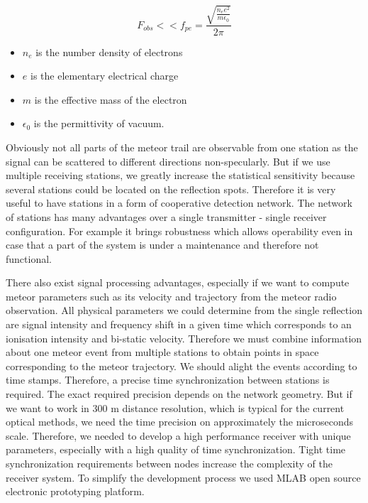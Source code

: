 \documentclass[twoside]{ctuthesis}
\theoremstyle{plain}
\theoremstyle{definition}
\theoremstyle{note}
\begin{document}
\begin{equation}
F_{obs} << f_{pe} =\frac{\sqrt{\frac{n_e e^2}{m \epsilon_0}}}{2 \pi}
\label{equ:plasma_frequency}
\end{equation}
\begin{itemize}
\item $n_e$ is the number density of electrons
\item $e$ is the elementary electrical charge
\item $m$ is the effective mass of the electron
\item $\epsilon_0$ is the permittivity of vacuum.
\end{itemize}

Obviously not all parts of the meteor trail are observable from one station as the signal can be scattered to different directions non-specularly.
But if we use multiple receiving stations, we greatly increase the statistical sensitivity because several stations could be located on the reflection spots. Therefore it is very useful to have stations in a form of cooperative detection network.
The network of stations has many advantages over a single transmitter - single receiver configuration. For example it brings robustness which allows operability even in case that a part of the system is under a maintenance and therefore not functional.
                   
There also exist signal processing advantages, especially if we want to compute meteor parameters such as its velocity and trajectory from the meteor radio observation. All physical parameters we could determine from the single reflection are signal intensity and frequency shift in a given time which corresponds to an ionisation intensity and bi-static velocity.
Therefore we must combine information about one meteor event from multiple stations to obtain points in space corresponding to the meteor trajectory. We should alight the events according to time stamps. Therefore, a precise time synchronization between stations is required. The exact required precision depends on the network geometry. But if we want to work in 300 m distance resolution, which is  typical for the current optical methods, we need the time precision on approximately the microseconds scale. Therefore, we needed to develop a high performance receiver with unique parameters, especially with a high quality of time synchronization. Tight time synchronization requirements between nodes increase the complexity of the receiver system. To simplify the development process we used MLAB open source electronic prototyping platform.
\end{document}
